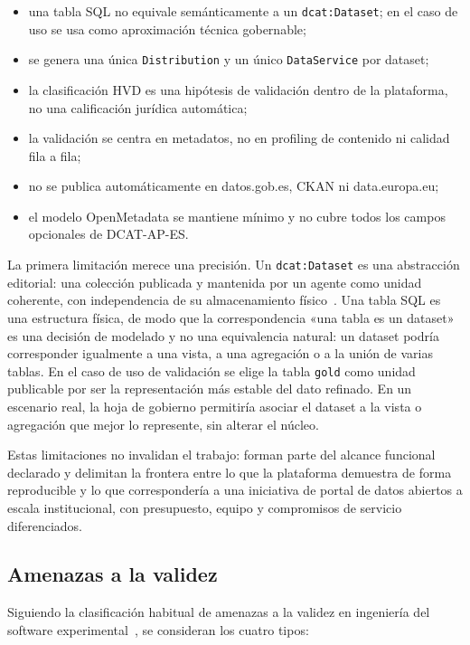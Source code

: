 \begin{itemize}
  \item una tabla SQL no equivale semánticamente a un \texttt{dcat:Dataset}; en el caso de uso se usa como aproximación técnica gobernable;
  \item se genera una única \texttt{Distribution} y un único \texttt{DataService} por dataset;
  \item la clasificación HVD es una hipótesis de validación dentro de la plataforma, no una calificación jurídica automática;
  \item la validación se centra en metadatos, no en profiling de contenido ni calidad fila a fila;
  \item no se publica automáticamente en datos.gob.es, CKAN ni data.europa.eu;
  \item el modelo OpenMetadata se mantiene mínimo y no cubre todos los campos opcionales de DCAT-AP-ES.
\end{itemize}

La primera limitación merece una precisión. Un \texttt{dcat:Dataset} es una abstracción editorial: una colección publicada y mantenida por un agente como unidad coherente, con independencia de su almacenamiento físico~\cite{w3cDcat3}. Una tabla \ac{SQL} es una estructura física, de modo que la correspondencia «una tabla es un dataset» es una decisión de modelado y no una equivalencia natural: un dataset podría corresponder igualmente a una vista, a una agregación o a la unión de varias tablas. En el caso de uso de validación se elige la tabla \texttt{gold} como unidad publicable por ser la representación más estable del dato refinado. En un escenario real, la hoja de gobierno permitiría asociar el dataset a la vista o agregación que mejor lo represente, sin alterar el núcleo.

Estas limitaciones no invalidan el trabajo: forman parte del alcance funcional declarado y delimitan la frontera entre lo que la plataforma demuestra de forma reproducible y lo que correspondería a una iniciativa de portal de datos abiertos a escala institucional, con presupuesto, equipo y compromisos de servicio diferenciados.

\subsection{Amenazas a la validez}

Siguiendo la clasificación habitual de amenazas a la validez en ingeniería del software experimental~\cite{wohlinExperimentation}, se consideran los cuatro tipos:

